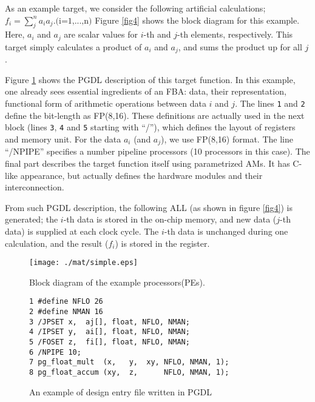 \documentclass{llncs}
\begin{document}
As an example target, we consider the following artificial calculations;
$f_i = \sum_j^n {a_i a_j}.\mbox{(i=1,...,n)}$
Figure \ref{fig4} shows the block diagram for this example.
Here, $a_i$ and $a_j$ are scalar values for $i$-th and
$j$-th elements, respectively.
This target simply calculates a product of $a_i$ and $a_j$, 
and sums the product up for all $j$.

Figure \ref{fig5} shows the PGDL description of this target function.
In this example, one already sees essential ingredients of an FBA:
data, their representation, functional form of arithmetic operations
between data $i$ and $j$.
The lines \verb|1| and \verb|2| define the bit-length as FP(8,16).
These definitions are actually used in the next block
(lines \verb|3|, \verb|4| and \verb|5| starting with ``/''),
which defines the layout of registers and memory unit.
For the data $a_i$ (and $a_j$), we use FP(8,16) format.
The line ``/NPIPE'' specifies a number pipeline processors (10 processors in this case).
The final part describes the target function itself using
parametrized AMs. It has C-like appearance, but
actually defines the hardware modules and their interconnection.

From such PGDL description, the following ALL (as shown in figure \ref{fig4})
is generated; the $i$-th data is stored in the on-chip memory,
and new data ($j$-th data) is supplied at each clock cycle.
The $i$-th data is unchanged during one calculation, and 
the result ($f_i$) is stored in the register.


\begin{figure}[htb]
  \begin{center}
    \begin{minipage}{.45\linewidth}
\begin{center}
\texttt{[image: ./mat/simple.eps]}
\caption{Block diagram of the example processors(PEs).}
\label{fig4}
\end{center}

    \end{minipage}
    \hspace{2.3pc}
    \begin{minipage}{.45\linewidth}
\scriptsize
\begin{verbatim}
1 #define NFLO 26
2 #define NMAN 16
3 /JPSET x,  aj[], float, NFLO, NMAN;
4 /IPSET y,  ai[], float, NFLO, NMAN;
5 /FOSET z,  fi[], float, NFLO, NMAN;
6 /NPIPE 10;
7 pg_float_mult  (x,   y,  xy, NFLO, NMAN, 1);
8 pg_float_accum (xy,  z,      NFLO, NMAN, 1);
\end{verbatim}
\caption{An example of design entry file written in PGDL}
\label{fig5}
    \end{minipage}
  \end{center}
\end{figure}
\end{document}
